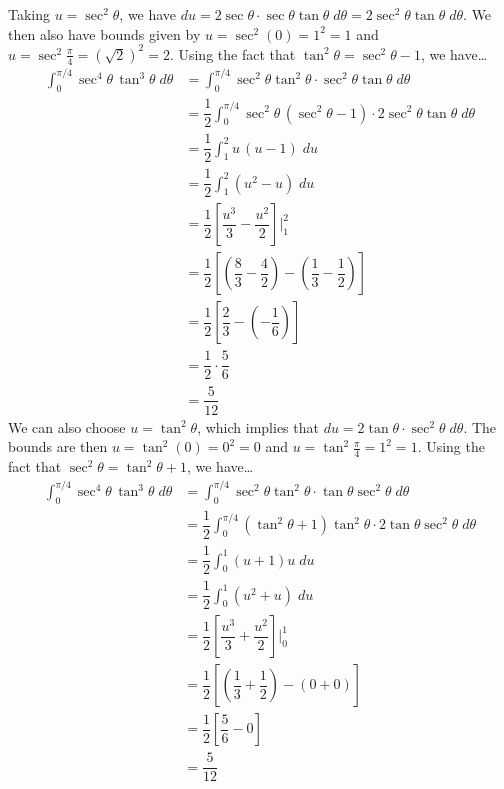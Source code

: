 \documentclass[12pt,letterpaper]{exam}
\begin{document}
\begin{questions}
{Taking $u= \sec^2 \theta$, we have $du= 2 \sec \theta \cdot \sec \theta \tan \theta \;d\theta= 2 \sec^2 \theta \tan \theta \;d\theta$. We then also have bounds given by $u= \sec^2(0)= 1^2= 1$ and $u= \sec^2 \frac{\pi}{4}= (\sqrt{2})^2= 2$. Using the fact that $\tan^2 \theta= \sec^2 \theta - 1$, we have\dots
	\[
	\begin{aligned}
	\int_0^{\pi/4} \sec^4 \theta \, \tan^3 \theta \;d\theta&= \int_0^{\pi/4} \sec^2 \theta \tan^2 \theta \cdot \sec^2 \theta \tan \theta \;d\theta \\
	&= \dfrac{1}{2} \int_0^{\pi/4} \sec^2 \theta \, (\sec^2 \theta - 1) \cdot 2 \sec^2 \theta \tan \theta \;d\theta \\
	&= \dfrac{1}{2} \int_1^{2} u \, (u - 1) \;du \\
	&= \dfrac{1}{2} \int_1^2 (u^2 - u) \;du \\
	&= \dfrac{1}{2} \left[ \dfrac{u^3}{3} - \dfrac{u^2}{2} \right] \bigg|_1^2 \\
	&= \dfrac{1}{2} \left[ \left( \dfrac{8}{3} - \dfrac{4}{2} \right) - \left( \dfrac{1}{3} - \dfrac{1}{2} \right) \right] \\
	&= \dfrac{1}{2} \left[ \dfrac{2}{3} - \left(-\dfrac{1}{6} \right) \right] \\
	&= \dfrac{1}{2} \cdot \dfrac{5}{6} \\
	&= \dfrac{5}{12}
	\end{aligned}
	\] 
We can also choose $u= \tan^2 \theta$, which implies that $du= 2 \tan \theta \cdot \sec^2 \theta \;d\theta$. The bounds are then $u= \tan^2(0)= 0^2= 0$ and $u= \tan^2 \frac{\pi}{4}= 1^2= 1$. Using the fact that $\sec^2 \theta= \tan^2 \theta + 1$, we have\dots
	\[
	\begin{aligned}
	\int_0^{\pi/4} \sec^4 \theta \, \tan^3 \theta \;d\theta&= \int_0^{\pi/4} \sec^2 \theta \tan^2 \theta \cdot \tan \theta \sec^2 \theta \;d\theta \\
	&= \dfrac{1}{2} \int_0^{\pi/4} (\tan^2 \theta + 1) \tan^2 \theta \cdot 2 \tan \theta \sec^2 \theta \;d\theta \\
	&= \dfrac{1}{2} \int_0^1 (u + 1) u \;du \\
	&= \dfrac{1}{2} \int_0^1 (u^2 + u) \;du \\
	&= \dfrac{1}{2} \left[ \dfrac{u^3}{3} + \dfrac{u^2}{2} \right] \bigg|_0^1 \\
	&= \dfrac{1}{2} \left[ \left( \dfrac{1}{3} + \dfrac{1}{2} \right) - \left( 0 + 0 \right) \right] \\
	&= \dfrac{1}{2} \left[ \dfrac{5}{6} - 0 \right] \\
	&= \dfrac{5}{12}
	\end{aligned}
	\]

}
\end{questions}
\end{document}
